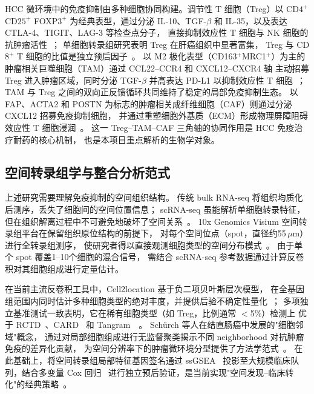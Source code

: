 \documentclass[12pt, a4paper]{ctexart}
\begin{document}
HCC 微环境中的免疫抑制由多种细胞协同构建。调节性 T 细胞（Treg）以 CD$4^+$CD$25^+$ FOXP$3^+$ 为经典表型，通过分泌 IL-10、TGF-$\beta$ 和 IL-35，以及表达 CTLA-4、TIGIT、LAG-3 等检查点分子，
直接抑制效应性 T 细胞与 NK 细胞的抗肿瘤活性~\citep{sakaguchi2020regulatory}；
单细胞转录组研究表明 Treg 在肝癌组织中显著富集，
Treg 与 CD$8^+$ T 细胞的比值是独立预后因子~\citep{zheng2017landscape}。
以 M2 极化表型（CD163$^+$MRC1$^+$）为主的肿瘤相关巨噬细胞（TAM）通过 CCL22--CCR4 和 CXCL12--CXCR4 轴
主动招募 Treg 进入肿瘤区域，同时分泌 TGF-$\beta$ 并高表达 PD-L1 以抑制效应性 T 细胞~\citep{biswas2012macrophage,noy2014tumor}；
TAM 与 Treg 之间的双向正反馈循环共同维持了稳定的局部免疫抑制生态。
以 FAP、ACTA2 和 POSTN 为标志的肿瘤相关成纤维细胞（CAF）则通过分泌 CXCL12 招募免疫抑制细胞，
并通过重塑细胞外基质（ECM）形成物理屏障阻碍效应性 T 细胞浸润~\citep{kalluri2016biology,mariathasan2018tgfb}。
这一 Treg--TAM--CAF 三角轴的协同作用是 HCC 免疫治疗耐药的核心机制，
也是本项目重点解析的生物学对象。

\subsection{空间转录组学与整合分析范式}

上述研究需要理解免疫抑制的空间组织结构。
传统 bulk RNA-seq 将组织均质化后测序，丢失了细胞间的空间位置信息；
scRNA-seq 虽能解析单细胞转录特征，但在组织解离过程中不可避免地破坏了空间关系~\citep{luecken2019current}。
10x Genomics Visium 空间转录组平台在保留组织原位结构的前提下，
对每个空间位点（spot，直径约55\,$\mu$m）进行全转录组测序，
使研究者得以直接观测细胞类型的空间分布模式~\citep{williams2022introduction}。
由于单个 spot 覆盖1--10个细胞的混合信号，
需结合 scRNA-seq 参考数据通过计算反卷积对其细胞组成进行定量估计。

在当前主流反卷积工具中，Cell2location 基于负二项贝叶斯层次模型，
在全基因组范围内同时估计多种细胞类型的绝对丰度，并提供后验不确定性量化~\citep{kleshchevnikov2022cell2location}；
多项独立基准测试一致表明，它在稀有细胞类型（如 Treg，比例通常 $<$5\%）检测上
优于 RCTD~\citep{cable2021robust}、CARD~\citep{ma2022integrative} 和 Tangram~\citep{biancalani2021deep}~\citep{li2022benchmarking,sang2023spotless,yan2023benchmarking}。
Schürch 等人在结直肠癌中发展的"细胞邻域"概念，
通过对局部细胞组成进行无监督聚类揭示不同 neighborhood 对抗肿瘤免疫的差异化贡献，
为空间分辨率下的肿瘤微环境分型提供了方法学范式~\citep{schurch2020coordinated}。
在此基础上，将空间转录组局部特征基因签名通过 ssGSEA~\citep{barbie2009systematic}
投影至大规模临床队列，结合多变量 Cox 回归~\citep{cox1972regression}
进行独立预后验证，是当前实现"空间发现--临床转化"的经典策略~\citep{hanzelmann2013gsva}。
\end{document}
